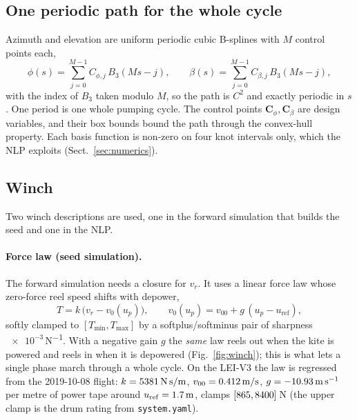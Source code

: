 \documentclass[11pt,a4paper]{article}
\newcommand{\code}[1]{\texttt{\small #1}}
\newcommand{\vect}[1]{\boldsymbol{#1}}
\begin{document}
\subsection{One periodic path for the whole cycle}

Azimuth and elevation are uniform periodic cubic B-splines with $M$ control
points each,
\begin{equation}
  \phi(s) = \sum_{j=0}^{M-1} C_{\phi,j}\, B_3\!\left(Ms - j\right),\qquad
  \beta(s) = \sum_{j=0}^{M-1} C_{\beta,j}\, B_3\!\left(Ms - j\right),
  \label{eq:spline}
\end{equation}
with the index of $B_3$ taken modulo $M$, so the path is $C^2$ and exactly
periodic in $s$. One period is one whole pumping cycle. The control points
$\vect C_\phi,\vect C_\beta$ are design variables, and their box bounds bound
the path through the convex-hull property. Each basis function is non-zero on
four knot intervals only, which the NLP exploits (Sect.~\ref{sec:numerics}).

\subsection{Winch}
\label{sec:winch}

Two winch descriptions are used, one in the forward simulation that builds
the seed and one in the NLP.

\paragraph{Force law (seed simulation).}
The forward simulation needs a closure for $v_r$. It uses a linear force law
whose zero-force reel speed shifts with depower,
\begin{equation}
  T = k\,\bigl(v_r - v_0(u_p)\bigr),\qquad
  v_0(u_p) = v_{00} + g\,(u_p - u_\mathrm{ref}),
  \label{eq:winch}
\end{equation}
softly clamped to $[T_{\min},T_{\max}]$ by a softplus/softminus pair of
sharpness $\num{e-3}$\,\si{N^{-1}}. With a negative gain $g$ the
\emph{same} law reels out when the kite is powered and reels in when it is
depowered (Fig.~\ref{fig:winch}); this is what lets a single phase march
through a whole cycle. On the LEI-V3 the law is regressed from the
2019-10-08 flight: $k=\SI{5381}{N\,s/m}$, $v_{00}=\SI{0.412}{m/s}$,
$g=\SI{-10.93}{m\,s^{-1}}$ per metre of power tape around
$u_\mathrm{ref}=\SI{1.7}{m}$, clamps
$[\num{865},\num{8400}]$\,\si{N} (the upper clamp is the drum
rating from \code{system.yaml}).
\end{document}
